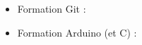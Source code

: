 \begin{frame}
   \begin{itemize}
      \item Formation Git :
      \item Formation Arduino (et C) :
   \end{itemize}
\end{frame}
